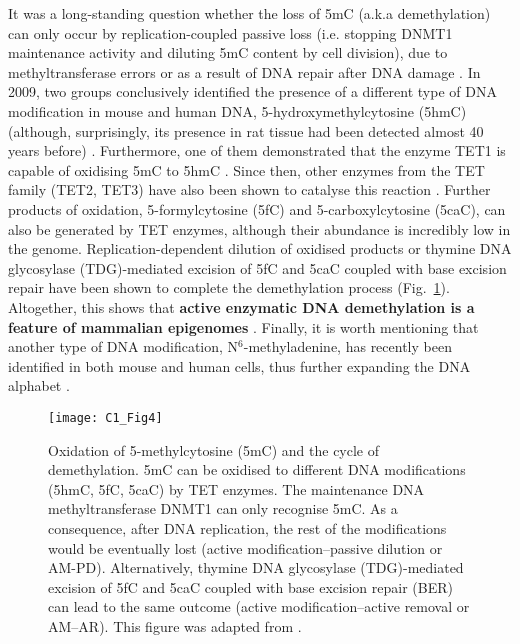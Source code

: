 It was a long-standing question whether the loss of 5mC (a.k.a demethylation) can only occur by replication-coupled passive loss (i.e. stopping DNMT1 maintenance activity and diluting 5mC content by cell division), due to methyltransferase errors or as a result of DNA repair after DNA damage \cite{Iurlaro2017}. In 2009, two groups conclusively identified the presence of a different type of DNA modification in mouse and human DNA, 5-hydroxymethylcytosine (\acrshort{5hmC}) \cite{Kriaucionis2009,Tahiliani2009} (although, surprisingly, its presence in rat tissue had been detected almost 40 years before) \cite{Penn1972}. Furthermore, one of them demonstrated that the enzyme TET1 is capable of oxidising 5mC to 5hmC \cite{Tahiliani2009}. Since then, other enzymes from the TET family (TET2, TET3) have also been shown to catalyse this reaction \cite{Ito2010}. Further products of oxidation, 5-formylcytosine (\acrshort{5fC}) and 5-carboxylcytosine (\acrshort{5caC}), can also be generated by TET enzymes, although their abundance is incredibly low in the genome. Replication-dependent dilution of oxidised products or thymine DNA glycosylase (\acrshort{TDG})-mediated excision of 5fC and 5caC coupled with base excision repair have been shown to complete the demethylation process (Fig.~\ref{fig:c1_fig4}). Altogether, this shows that \textbf{active enzymatic DNA demethylation is a feature of mammalian epigenomes} \cite{Wu2017}. Finally, it is worth mentioning that another type of DNA modification, N$^6$-methyladenine, has recently been identified in both mouse and human cells, thus further expanding the DNA alphabet \cite{Wu2016,Xiao2018}.

\begin{figure}[htbp!] 
	\centering    
	\texttt{[image: C1\_Fig4]}
	\vspace*{1 mm}
	\caption[Oxidation of 5-methylcytosine and the cycle of demethylation]{Oxidation of 5-methylcytosine (5mC) and the cycle of demethylation. 5mC can be oxidised to different DNA modifications (5hmC, 5fC, 5caC) by TET enzymes. The maintenance DNA methyltransferase DNMT1 can only recognise 5mC. As a consequence, after DNA replication, the rest of the modifications would be eventually lost (active modification–passive dilution or AM-PD). Alternatively, thymine DNA glycosylase (\acrshort{TDG})-mediated excision of 5fC and 5caC coupled with base excision repair (\acrshort{BER}) can lead to the same outcome (active modification–active removal or AM–AR). This figure was adapted from \cite{Wu2017}.}
	\label{fig:c1_fig4}
\end{figure}

